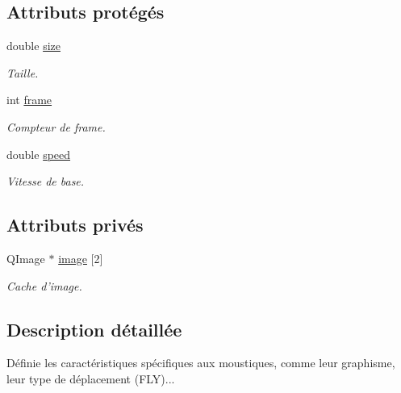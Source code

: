 \subsection*{Attributs protégés}
\begin{DoxyCompactItemize}
\item 
double \hyperlink{classBug_a27a0f0b84d15525e409955509e6e3c42}{size}
\begin{DoxyCompactList}\small\item\em Taille. \end{DoxyCompactList}\item 
int \hyperlink{classBug_ad7e3597cf049f1051be94fcaf2fd3598}{frame}
\begin{DoxyCompactList}\small\item\em Compteur de frame. \end{DoxyCompactList}\item 
double \hyperlink{classBug_a13b95fbf23748ea853b01bfd0b0e7fc8}{speed}
\begin{DoxyCompactList}\small\item\em Vitesse de base. \end{DoxyCompactList}\end{DoxyCompactItemize}
\subsection*{Attributs privés}
\begin{DoxyCompactItemize}
\item 
QImage $\ast$ \hyperlink{classMosquito_a8c451b0473a7d48ee0ed7de9627f46cb}{image} \mbox{[}2\mbox{]}
\begin{DoxyCompactList}\small\item\em Cache d'image. \end{DoxyCompactList}\end{DoxyCompactItemize}


\subsection{Description détaillée}
Définie les caractéristiques spécifiques aux moustiques, comme leur graphisme, leur type de déplacement (FLY)... 

